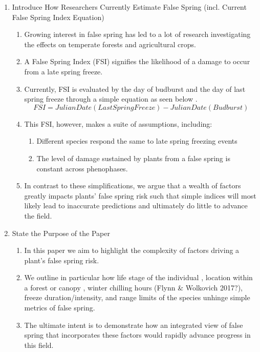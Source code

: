 \documentclass{article}\usepackage[]{graphicx}\usepackage[]{color}
\begin{document}
\begin{enumerate}
\item Introduce How Researchers Currently Estimate False Spring (incl. Current False Spring Index Equation)
\begin{enumerate}
\item Growing interest in false spring has led to a lot of research investigating the effects on temperate forests and agricultural crops. 
\item A False Spring Index (FSI) signifies the likelihood of a damage to occur from a late spring freeze. 
\item Currently, FSI is evaluated by the day of budburst and the day of last spring freeze through a simple equation as seen below \citep{Marino2011}. 
\begin{equation} \label{eq:1}
FSI = Julian Date (Last Spring Freeze) - Julian Date (Budburst)
\end{equation}
\item This FSI, however, makes a suite of assumptions, including:
\begin{enumerate}
\item Different species respond the same to late spring freezing events 
\item The level of damage sustained by plants from a false spring is constant across phenophases. 
\end{enumerate}
\item In contrast to these simplifications, we argue that a wealth of factors greatly impacts plants' false spring risk such that simple indices will most likely lead to inaccurate predictions and ultimately do little to advance the field. 
\end{enumerate}

\item State the Purpose of the Paper
\begin{enumerate}
\item In this paper we aim to highlight the complexity of factors driving a plant's false spring risk. 
\item We outline in particular how life stage of the individual \citep{Caffarra2011}, location within a forest or canopy \citep{Augspurger2013}, winter chilling hours (Flynn \& Wolkovich 2017?), freeze duration/intensity, and range limits of the species \citep{Martin2010} unhinge simple metrics of false spring. 
\item The ultimate intent is to demonstrate how an integrated view of false spring that incorporates these factors would rapidly advance progress in this field.  
\end{enumerate}
\end{enumerate}
\end{document}
